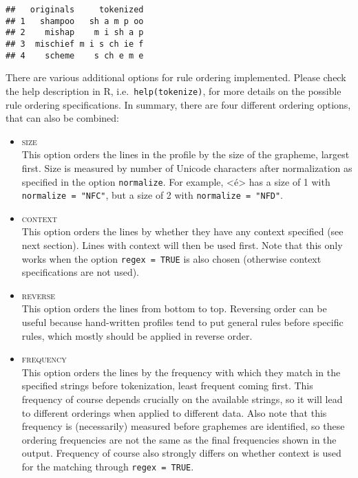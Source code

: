 \documentclass[output=inprep,
		biblatex
		]{LSP/langsci}\usepackage[]{graphicx}\usepackage[]{color}
\makeatletter
\newenvironment{kframe}{%
 \def\at@end@of@kframe{}%
 \ifinner\ifhmode%
  \def\at@end@of@kframe{\end{minipage}}%
  \begin{minipage}{\columnwidth}%
 \fi\fi%
 \def\FrameCommand##1{\hskip\@totalleftmargin \hskip-\fboxsep
 \colorbox{shadecolor}{##1}\hskip-\fboxsep
     \hskip-\linewidth \hskip-\@totalleftmargin \hskip\columnwidth}%
 \MakeFramed {\advance\hsize-\width
   \@totalleftmargin\z@ \linewidth\hsize
   \@setminipage}}%
 {\par\unskip\endMakeFramed%
 \at@end@of@kframe}
\newenvironment{knitrout}{}{} %
\makeatother
\begin{document}
\begin{knitrout}\footnotesize
{}\color{fgcolor}\begin{kframe}
\begin{verbatim}
##   originals     tokenized
## 1   shampoo   sh a m p oo
## 2    mishap    m i sh a p
## 3  mischief m i s ch ie f
## 4    scheme    s ch e m e
\end{verbatim}
\end{kframe}
\end{knitrout}

There are various additional options for rule ordering implemented. Please check
the help description in R, i.e.\ \texttt{help(tokenize)}, for more details on the
possible rule ordering specifications. In summary, there are four different 
ordering options, that can also be combined:

\begin{itemize}
  
   \item \textsc{size}\\
         This option orders the lines in the profile by the size of the
         grapheme, largest first. Size is measured by number of Unicode
         characters after normalization as specified in the option
         \texttt{normalize}. For example, <é> has a size of 1 with
         \texttt{normalize = "NFC"}, but a size of 2 with
         \texttt{normalize = "NFD"}.

   \item \textsc{context}\\ This option orders the lines by whether they have
           any context specified (see next section). Lines with context will
           then be used first. Note that this only works when the option
           \texttt{regex = TRUE} is also chosen (otherwise context
           specifications are not used).

   \item \textsc{reverse}\\ This option orders the lines from bottom to top.
         Reversing order can be useful because hand-written profiles tend to put
         general rules before specific rules, which mostly should be applied in
         reverse order.

  \item \textsc{frequency}\\
         This option orders the lines by the frequency with which they
         match in the specified strings before tokenization, least frequent
         coming first. This frequency of course depends crucially on the
         available strings, so it will lead to different orderings when applied
         to different data. Also note that this frequency is (necessarily)
         measured before graphemes are identified, so these ordering frequencies
         are not the same as the final frequencies shown in the output.
         Frequency of course also strongly differs on whether context is used
         for the matching through \texttt{regex = TRUE}.
  
\end{itemize}
\end{document}
